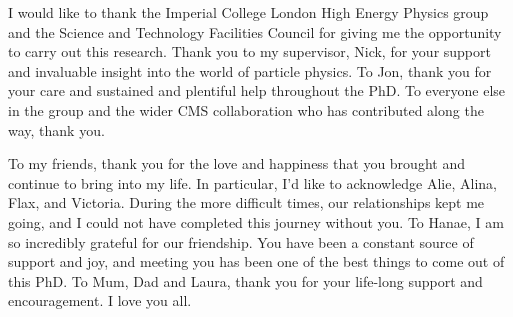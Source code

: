 
I would like to thank the Imperial College London High Energy Physics group and the Science and Technology Facilities Council for giving me the opportunity to carry out this research. Thank you to my supervisor, Nick, for your support and invaluable insight into the world of particle physics. To Jon, thank you for your care and sustained and plentiful help throughout the PhD. To everyone else in the group and the wider CMS collaboration who has contributed along the way, thank you.

To my friends, thank you for the love and happiness that you brought and continue to bring into my life. In particular, I'd like to acknowledge Alie, Alina, Flax, and Victoria. During the more difficult times, our relationships kept me going, and I could not have completed this journey without you. To Hanae, I am so incredibly grateful for our friendship. You have been a constant source of support and joy, and meeting you has been one of the best things to come out of this PhD. To Mum, Dad and Laura, thank you for your life-long support and encouragement. I love you all.

\restoregeometry

\cleardoublepage
{}
\tableofcontents

\cleardoublepage
{}
\listoffigures

\cleardoublepage
{}
\listoftables